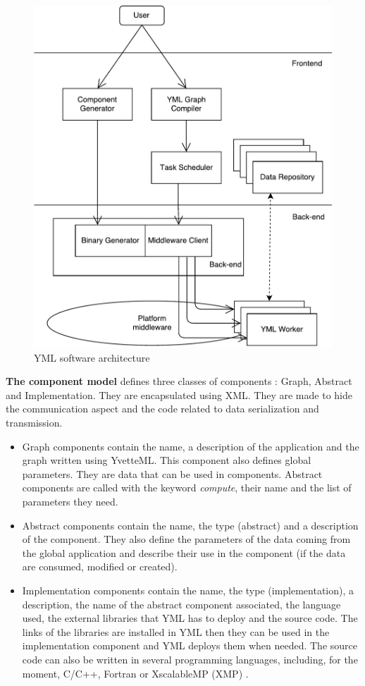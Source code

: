 \begin{figure}[h]
	\caption{YML software architecture \label{fig:schema}}
	\medskip
	\centering
	\includegraphics[width=.5\textwidth]{schema.pdf}
\end{figure}

\textbf{The component model} defines three classes of components : Graph, Abstract and Implementation.
They are encapsulated using XML.
They are made to hide the communication aspect and the code related to data serialization and transmission.

\begin{itemize}
	\item Graph components contain the name, a description of the application and the graph written using YvetteML.
	This component also defines global parameters.
	They are data that can be used in components.
	Abstract components are called with the keyword \textit{compute}, their name and the list of parameters they need.
	\item Abstract components contain the name, the type (abstract) and a description of the component.
	They also define the parameters of the data coming from the global application and describe their use in the component (if the data are consumed, modified or created).
	\item Implementation components contain the name, the type (implementation), a description, the name of the abstract component associated, the language used, the external libraries that YML has to deploy and the source code.
	The links of the libraries are installed in YML then they can be used in the implementation component and YML deploys them when needed.
	The source code can also be written in several programming languages, including, for the moment, C/C++, Fortran or XscalableMP (XMP) \cite{XMP}.
\end{itemize}


